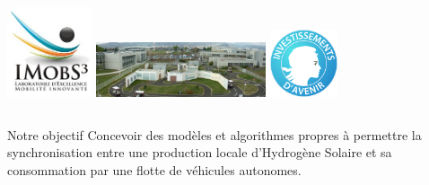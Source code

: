 \documentclass[hyperref={bookmarks=false},aspectratio=169]{beamer}
\begin{document}
\begin{frame}
	\begin{columns}[t]
\centering
\includegraphics[width=2.5cm]{./figures/imobs3.jpg}
\centering
\includegraphics[width=5cm]{./figures/pavinn.jpg}%
\centering
\includegraphics[width=2cm]{./figures/Investissements_d'avenir_-_logo.jpeg}
\end{columns}

 \begin{alertblock}{Notre objectif}
 Concevoir des modèles et algorithmes propres à permettre la synchronisation entre une
production locale d’Hydrogène Solaire et sa consommation par une flotte de véhicules
autonomes.

 \end{alertblock}
\end{frame}
\end{document}
